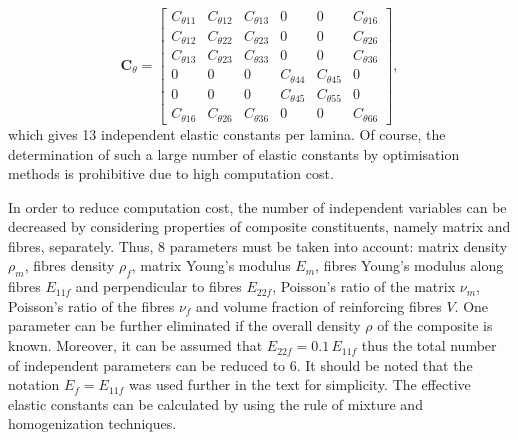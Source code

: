 \documentclass[preprint,12pt]{elsarticle}
\newcommand{\matr}[1]{\mathbf{#1}} %
\begin{document}
 \begin{equation}
 \matr{C}_{\theta} = \left[\begin{array}{cccccc} C_{\theta 11} & C_{\theta 12}& C_{\theta 13} & 0&0&C_{\theta 16}\\[2pt]
 C_{\theta 12}& C_{\theta 22} & C_{\theta 23}& 0 &0&C_{\theta 26}\\[2pt]
 C_{\theta 13}&C_{\theta 23}&C_{\theta 33}&0&0&C_{\theta 36}\\[2pt]
 0& 0&0&C_{\theta 44}& C_{\theta 45}&0\\[2pt]
 0&0&0&C_{\theta 45}&C_{\theta 55}&0\\[2pt]
 C_{\theta 16}&C_{\theta 26} &C_{\theta 36}&0&0&C_{\theta 66}
 \end{array}\right], 
 \label{eq:elastic_constatns_theta}
 \end{equation} 
 which gives 13 independent elastic constants per lamina. Of course, the determination of such a large number of elastic constants by optimisation methods is prohibitive due to high computation cost. 
 
 In order to reduce computation cost, the number of independent variables can be decreased by considering properties of composite constituents, namely matrix and fibres, separately. Thus,  8 parameters must be taken into account: matrix density $\rho_m$, fibres density $\rho_f$, matrix Young's modulus $E_m$, fibres Young's modulus along fibres $E_{11f}$ and perpendicular to fibres $E_{22f}$, Poisson's ratio of the matrix $\nu_m$, Poisson's ratio of the fibres $\nu_f$ and volume fraction of reinforcing fibres $V$. One parameter can be further eliminated if the overall density $\rho$ of the composite is known. Moreover, it can be assumed that $E_{22f} = 0.1\, E_{11f}$ thus the total number of independent parameters can be reduced to 6. It should be noted that the notation $E_f = E_{11f}$ was used further in the text for simplicity. The effective elastic constants can be calculated by using the rule of mixture and homogenization techniques.
\end{document}

